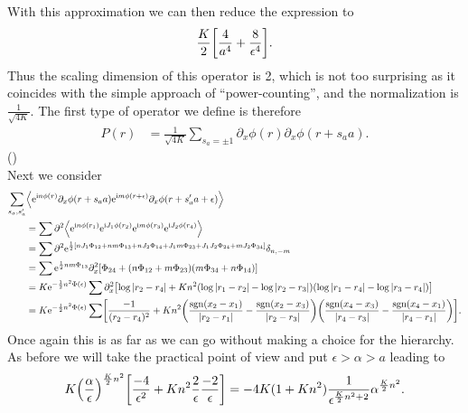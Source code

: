 \documentclass[english, parskip=full]{scrartcl}
\begin{document}
With this approximation we can then reduce the expression to
\begin{align}
\frac{K}{2} \klb*{\frac{4}{a^4} + \frac{8}{\epsilon^4}}.
\end{align}
Thus the scaling dimension of this operator is 2, which is not too surprising as it coincides with the simple approach of ``power-counting'', and the normalization is $\frac{1}{\sqrt{4K}}$.
The first type of operator we define is therefore
\begin{align}
P(r) &= \frac{1}{\sqrt{4K}} \sum_{s_a=\pm 1} \partial_x\phi(r) \partial_x\phi(r+s_aa).
\end{align}
()\\
Next we consider
\begin{align}
\sum_{s_a,s_a'} &\bra*{\powe{\i n\phi(r)} \partial_x\phi(r+s_aa) \powe{\i m\phi(r+\epsilon)} \partial_x\phi(r+s_a'a+\epsilon)}\\
&= \sum \partial^2 \bra*{\powe{\i n\phi(r_1)}\powe{\i J_1\phi(r_2)}\powe{\i m\phi(r_3)}\powe{\i J_2\phi(r_4)}}\\
&= \sum \partial^2 \powe{\frac{1}{2} \klb*{nJ_1 \Phi_{12} + nm \Phi_{13} + nJ_2 \Phi_{14} + J_1m\Phi_{23} + J_1J_2 \Phi_{24} + mJ_2 \Phi_{34}}} \delta_{n,-m}\\
&= \sum \powe{\frac{1}{2} nm \Phi_{13}} \partial_x^2 \klb*{\Phi_{24} + \kla*{n\Phi_{12} + m\Phi_{23}} \kla*{m\Phi_{34} + n\Phi_{14}}}\\
&= K \powe{-\frac{1}{2}n^2 \Phi(\epsilon)} \sum \partial_x^2 \klb*{\log |r_2-r_4| + Kn^2 \kla*{\log |r_1-r_2| - \log |r_2-r_3|} \kla*{\log|r_1-r_4| - \log|r_3-r_4|}}\\
&= K \powe{-\frac{1}{2}n^2 \Phi(\epsilon)} \sum \klb*{ \frac{-1}{(r_2-r_4)^2} + Kn^2 \kla*{\frac{\sgn(x_2-x_1)}{|r_2-r_1|} -\frac{\sgn(x_2-x_3)}{|r_2-r_3|}} \kla*{\frac{\sgn(x_4-x_3)}{|r_4-r_3|} - \frac{\sgn(x_4-x_1)}{|r_4-r_1|}}}.
\end{align}
Once again this is as far as we can go without making a choice for the hierarchy.
As before we will take the practical point of view and put $\epsilon>\alpha>a$ leading to
\begin{align}
K \kla*{\frac{\alpha}{\epsilon}}^{\frac{K}{2}n^2} \klb*{\frac{-4}{\epsilon^2} + Kn^2 \frac{2}{\epsilon} \frac{-2}{\epsilon}} = -4K (1+Kn^2) \frac{1}{\epsilon^{\frac{K}{2}n^2+2}} \alpha^{\frac{K}{2}n^2}.
\end{align}
\end{document}

